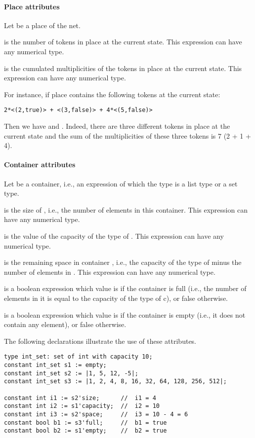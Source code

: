 \paragraph{Place attributes}
Let  be a place of the net.
\begin{description}
\item
   is the number of tokens in place  at the
  current state.
  This expression can have any numerical type.
\item
   is the cumulated multiplicities of the tokens in place
   at the current state.
  This expression can have any numerical type.
\end{description}
For instance, if place  contains the following tokens at
the current state:
\begin{lstlisting}
2*<(2,true)> + <(3,false)> + 4*<(5,false)>
\end{lstlisting}
Then we have  and
.
Indeed, there are three different tokens in place  at the current
state and the sum of the multiplicities of these three tokens is 7
(2 + 1 + 4).

\paragraph{Container attributes}
Let  be a container, i.e., an expression of which the type is a
list type or a set type.
\begin{description}
\item
   is the size of , i.e., the number of
  elements in this container.
  This expression can have any numerical type.
\item
   is the value of the capacity of the type of
  .
  This expression can have any numerical type.
\item
   is the remaining space in container ,
  i.e., the capacity of the type of  minus the number of elements
  in .
  This expression can have any numerical type.
\item
   is a boolean expression which value is 
  if the container is full (i.e., the number of elements in it is equal to the
  capacity of the type of c), or false otherwise.
\item
   is a boolean expression which value is 
  if the container is empty (i.e., it does not contain any element), or false
  otherwise.
\end{description}
The following declarations illustrate the use of these attributes.
\begin{lstlisting}
type int_set: set of int with capacity 10;
constant int_set s1 := empty;
constant int_set s2 := |1, 5, 12, -5|;
constant int_set s3 := |1, 2, 4, 8, 16, 32, 64, 128, 256, 512|;

constant int i1 := s2'size;      //  i1 = 4
constant int i2 := s1'capacity;  //  i2 = 10
constant int i3 := s2'space;     //  i3 = 10 - 4 = 6
constant bool b1 := s3'full;     //  b1 = true
constant bool b2 := s1'empty;    //  b2 = true
\end{lstlisting}

